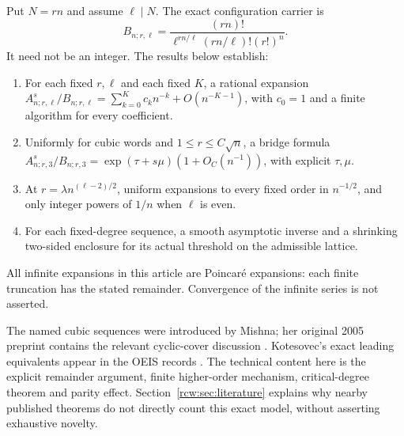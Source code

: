 \documentclass[11pt]{article}
\theoremstyle{definition}\newtheorem{definition}[theorem]{Definition}
\theoremstyle{remark}\newtheorem{remark}[theorem]{Remark}
\newcommand{\A}{A^s_{n;r,\ell}}
\newcommand{\B}{B_{n;r,\ell}}
\numberwithin{equation}{section}
\begin{document}
Put $N=rn$ and assume $\ell\mid N$. The exact configuration carrier is
\begin{equation}\label{rcw:eq:B}
 \B=\frac{(rn)!}{\ell^{rn/\ell}(rn/\ell)!(r!)^n}.
\end{equation}
It need not be an integer. The results below establish:
\begin{enumerate}
\item For each fixed $r,\ell$ and each fixed $K$, a rational expansion
$\A/\B=\sum_{k=0}^K c_k n^{-k}+O(n^{-K-1})$, with $c_0=1$ and a finite algorithm for every coefficient.
\item Uniformly for cubic words and $1\le r\le C\sqrt n$, a bridge formula
$A^s_{n;r,3}/B_{n;r,3}=\exp(\tau+s\mu)(1+O_C(n^{-1}))$, with explicit $\tau,\mu$.
\item At $r=\lambda n^{(\ell-2)/2}$, uniform expansions to every fixed order in $n^{-1/2}$, and only integer powers of $1/n$ when $\ell$ is even.
\item For each fixed-degree sequence, a smooth asymptotic inverse and a shrinking two-sided enclosure for its actual threshold on the admissible lattice.
\end{enumerate}
All infinite expansions in this article are Poincar\'e expansions: each finite truncation has the stated remainder. Convergence of the infinite series is not asserted.

The named cubic sequences were introduced by Mishna; her original 2005 preprint contains the relevant cyclic-cover discussion \cite{mishna}. Kotesovec's exact leading equivalents appear in the OEIS records \cite{oeis108242,oeis110105,oeis110104,oeis110106}. The technical content here is the explicit remainder argument, finite higher-order mechanism, critical-degree theorem and parity effect. Section~\ref{rcw:sec:literature} explains why nearby published theorems do not directly count this exact model, without asserting exhaustive novelty.
\end{document}
